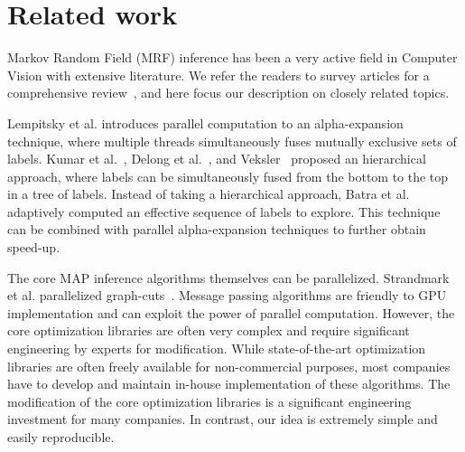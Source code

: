 \section{Related work}


Markov Random Field (MRF) inference has been a very active field in
Computer Vision with extensive literature. We refer the readers to
survey articles for a comprehensive
review~\cite{middlebury_mrf,comparative_study_of_modern_inference}, and
here focus our description on closely related topics.


\noindent Lempitsky et al. introduces parallel computation to an
alpha-expansion technique, where multiple threads simultaneously fuses
mutually exclusive sets of labels. Kumar et
al.~\cite{hierarchical_graph_cuts_kumar_and_koller}, Delong et
al.~\cite{delong}, and Veksler~\cite{olga} proposed an hierarchical
approach, where labels can be simultaneously fused from the bottom to
the top in a tree of labels. 
% 
Instead of taking a hierarchical approach, Batra et
al.~\cite{Dhruv_pushmeet_making_the_right_move} adaptively computed an
effective sequence of labels to explore. This technique can be combined
with parallel alpha-expansion techniques to further obtain speed-up.




\noindent
The core MAP inference algorithms themselves can be parallelized.
Strandmark et al. parallelized graph-cuts~\cite{strandmark2010parallel}.
%
Message passing algorithms are friendly to GPU implementation and can
exploit the power of parallel computation.
%
However, the core optimization libraries are often very complex and
require significant engineering by experts for modification.
%
While state-of-the-art optimization libraries are often freely available
for non-commercial purposes, most companies have to develop and maintain
in-house implementation of these algorithms. The modification of the
core optimization libraries is a significant engineering investment for
many companies. In contrast, our idea is extremely simple and easily
reproducible.






